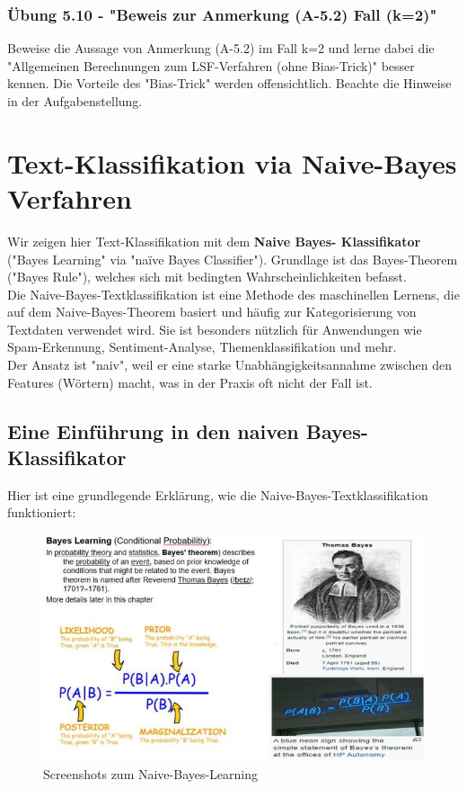 \documentclass[12pt]{article}
\begin{document}
\subsubsection{Übung 5.10 - "Beweis zur Anmerkung (A-5.2) Fall (k=2)"}
%
Beweise die Aussage von Anmerkung (A-5.2) im Fall k=2 und lerne dabei die "Allgemeinen Berechnungen zum LSF-Verfahren (ohne Bias-Trick)" besser kennen. Die Vorteile des "Bias-Trick" werden offensichtlich. Beachte die Hinweise in der Aufgabenstellung. 


\newpage

\section{Text-Klassifikation via Naive-Bayes Verfahren \\}


Wir zeigen hier Text-Klassifikation mit dem \textbf{Naive Bayes- Klassifikator} ("Bayes Learning" via "naïve Bayes Classifier"). Grundlage ist das Bayes-Theorem ("Bayes Rule"), welches sich mit bedingten Wahrscheinlichkeiten befasst.\\
Die Naive-Bayes-Textklassifikation ist eine Methode des maschinellen Lernens, die auf dem Naive-Bayes-Theorem basiert und häufig zur Kategorisierung von Textdaten verwendet wird. Sie ist besonders nützlich für Anwendungen wie Spam-Erkennung, Sentiment-Analyse, Themenklassifikation und mehr.\\

Der Ansatz ist "naiv", weil er eine starke Unabhängigkeitsannahme zwischen den Features (Wörtern) macht, was in der Praxis oft nicht der Fall ist.

\subsection{Eine Einführung in den naiven Bayes-Klassifikator}

Hier ist eine grundlegende Erklärung, wie die Naive-Bayes-Textklassifikation funktioniert:\\

\begin{figure}[htb]
  \centering
  \hspace*{-1.5cm} 
  \includegraphics[width=1.2\textwidth]{Naive-Bayes-Learning}
  \caption{Screenshots zum Naive-Bayes-Learning}
\label{fig:NB_Learning}
\end{figure}
\end{document}
